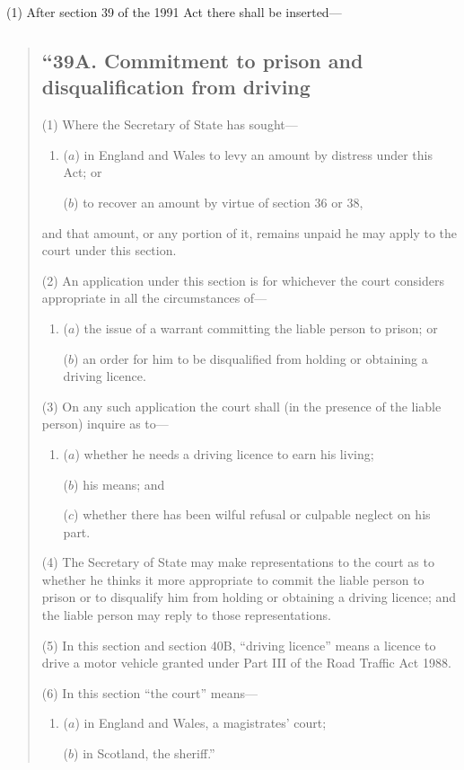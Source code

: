 \documentclass[12pt,a4paper]{article}
\begin{document}
(1) After section 39 of the 1991 Act there shall be inserted—
\begin{quotation}
\subsection*{\sloppy “39A. Commitment to prison and disqualification from driving}

(1) Where the Secretary of State has sought—
\begin{enumerate}\item[]
($a$) in England and Wales to levy an amount by distress under this Act; or

($b$) to recover an amount by virtue of section 36 or 38,
\end{enumerate}
and that amount, or any portion of it, remains unpaid he may apply to the court under this section.

(2) An application under this section is for whichever the court considers appropriate in all the circumstances of—
\begin{enumerate}\item[]
($a$) the issue of a warrant committing the liable person to prison; or

($b$) an order for him to be disqualified from holding or obtaining a driving licence.
\end{enumerate}

(3) On any such application the court shall (in the presence of the liable person) inquire as to—
\begin{enumerate}\item[]
($a$) whether he needs a driving licence to earn his living;

($b$) his means; and

($c$) whether there has been wilful refusal or culpable neglect on his part.
\end{enumerate}

(4) The Secretary of State may make representations to the court as to whether he thinks it more appropriate to commit the liable person to prison or to disqualify him from holding or obtaining a driving licence; and the liable person may reply to those representations.

(5) In this section and section 40B, “driving licence” means a licence to drive a motor vehicle granted under Part III of the Road Traffic Act 1988. 

(6) In this section “the court” means—
\begin{enumerate}\item[]
($a$) in England and Wales, a magistrates' court;

($b$) in Scotland, the sheriff.”
\end{enumerate}
\end{quotation}
\end{document}
